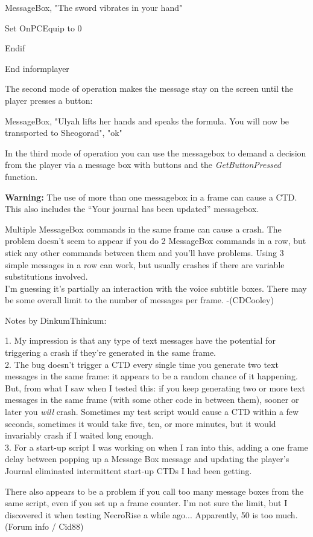 \documentclass[
]{article}
\begin{document}
MessageBox, "The sword vibrates in your hand"

Set OnPCEquip to 0

Endif

End informplayer

The second mode of operation makes the message stay on the screen until
the player presses a button:

MessageBox, "Ulyah lifts her hands and speaks the formula. You will now
be transported to Sheogorad", "ok"

In the third mode of operation you can use the messagebox to demand a
decision from the player via a message box with buttons and the
\emph{GetButtonPressed} function.

\textbf{Warning:} The use of more than one messagebox in a frame can
cause a CTD. This also includes the ``Your journal has been updated''
messagebox.

Multiple MessageBox commands in the same frame can cause a crash. The
problem doesn't seem to appear if you do 2 MessageBox commands in a row,
but stick any other commands between them and you'll have problems.
Using 3 simple messages in a row can work, but usually crashes if there
are variable substitutions involved.\\
I'm guessing it's partially an interaction with the voice subtitle
boxes. There may be some overall limit to the number of messages per
frame. -(CDCooley)

Notes by DinkumThinkum:

1. My impression is that any type of text messages have the potential
for triggering a crash if they're generated in the same frame.\\
2. The bug doesn't trigger a CTD every single time you generate two text
messages in the same frame: it appears to be a random chance of it
happening. But, from what I saw when I tested this: if you keep
generating two or more text messages in the same frame (with some other
code in between them), sooner or later you \emph{will} crash. Sometimes
my test script would cause a CTD within a few seconds, sometimes it
would take five, ten, or more minutes, but it would invariably crash if
I waited long enough.\\
3. For a start-up script I was working on when I ran into this, adding a
one frame delay between popping up a Message Box message and updating
the player's Journal eliminated intermittent start-up CTDs I had been
getting.

There also appears to be a problem if you call too many message boxes
from the same script, even if you set up a frame counter. I'm not sure
the limit, but I discovered it when testing NecroRise a while ago...
Apparently, 50 is too much. (Forum info / Cid88)
\end{document}
